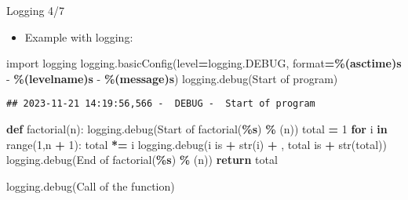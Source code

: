 \documentclass[
  8pt,
  ignorenonframetext,
]{beamer}
\newenvironment{Shaded}{\begin{snugshade}}{\end{snugshade}}
\newcommand{\BuiltInTok}[1]{#1}
\newcommand{\ControlFlowTok}[1]{\textcolor[rgb]{0.13,0.29,0.53}{\textbf{#1}}}
\newcommand{\DecValTok}[1]{\textcolor[rgb]{0.00,0.00,0.81}{#1}}
\newcommand{\ImportTok}[1]{#1}
\newcommand{\KeywordTok}[1]{\textcolor[rgb]{0.13,0.29,0.53}{\textbf{#1}}}
\newcommand{\NormalTok}[1]{#1}
\newcommand{\OperatorTok}[1]{\textcolor[rgb]{0.81,0.36,0.00}{\textbf{#1}}}
\newcommand{\SpecialCharTok}[1]{\textcolor[rgb]{0.81,0.36,0.00}{\textbf{#1}}}
\newcommand{\StringTok}[1]{\textcolor[rgb]{0.31,0.60,0.02}{#1}}
\providecommand{\tightlist}{%
  \setlength{\itemsep}{0pt}\setlength{\parskip}{0pt}}
\begin{document}
\begin{frame}[fragile]{Logging 4/7}
\protect\hypertarget{logging-47}{}
\begin{itemize}
\tightlist
\item
  Example with logging:
\end{itemize}

\begin{Shaded}
\begin{Highlighting}[]
\ImportTok{import}\NormalTok{ logging}
\NormalTok{logging.basicConfig(level}\OperatorTok{=}\NormalTok{logging.DEBUG, }\BuiltInTok{format}\OperatorTok{=}\StringTok{\textquotesingle{}}\SpecialCharTok{\%(asctime)s}\StringTok{ {-}  }\SpecialCharTok{\%(levelname)s}\StringTok{ {-}  }\SpecialCharTok{\%(message)s}\StringTok{\textquotesingle{}}\NormalTok{)}
\NormalTok{logging.debug(}\StringTok{\textquotesingle{}Start of program\textquotesingle{}}\NormalTok{)}
\end{Highlighting}
\end{Shaded}

\begin{verbatim}
## 2023-11-21 14:19:56,566 -  DEBUG -  Start of program
\end{verbatim}

\begin{Shaded}
\begin{Highlighting}[]
\KeywordTok{def}\NormalTok{ factorial(n):}
\NormalTok{    logging.debug(}\StringTok{\textquotesingle{}Start of factorial(}\SpecialCharTok{\%s}\StringTok{)\textquotesingle{}}  \OperatorTok{\%}\NormalTok{ (n))}
\NormalTok{    total }\OperatorTok{=} \DecValTok{1}
    \ControlFlowTok{for}\NormalTok{ i }\KeywordTok{in} \BuiltInTok{range}\NormalTok{(}\DecValTok{1}\NormalTok{,n }\OperatorTok{+} \DecValTok{1}\NormalTok{):}
\NormalTok{        total }\OperatorTok{*=}\NormalTok{ i}
\NormalTok{        logging.debug(}\StringTok{\textquotesingle{}i is \textquotesingle{}} \OperatorTok{+} \BuiltInTok{str}\NormalTok{(i) }\OperatorTok{+} \StringTok{\textquotesingle{}, total is \textquotesingle{}} \OperatorTok{+} \BuiltInTok{str}\NormalTok{(total))}
\NormalTok{    logging.debug(}\StringTok{\textquotesingle{}End of factorial(}\SpecialCharTok{\%s}\StringTok{)\textquotesingle{}}  \OperatorTok{\%}\NormalTok{ (n))}
    \ControlFlowTok{return}\NormalTok{ total}

\NormalTok{logging.debug(}\StringTok{\textquotesingle{}Call of the function\textquotesingle{}}\NormalTok{)}
\end{Highlighting}
\end{Shaded}


\end{frame}
\end{document}
